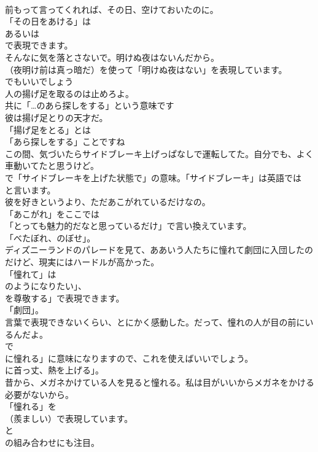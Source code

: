 \documentclass[8pt]{extreport}
\begin{document}
\begin{CJK}{UTF8}{min}
\\	前もって言ってくれれば、その日、空けておいたのに。 
\\	「その日をあける」は
\\	あるいは
\\	で表現できます。	
\\	そんなに気を落とさないで。明けぬ夜はないんだから。 
\\	（夜明け前は真っ暗だ）を使って「明けぬ夜はない」を表現しています。
\\	でもいいでしょう	
\\	人の揚げ足を取るのは止めろよ。 
\\	共に「…のあら探しをする」という意味です	
\\	彼は揚げ足とりの天才だ。 
\\	「揚げ足をとる」とは
\\	「あら探しをする」ことですね	
\\	この間、気づいたらサイドブレーキ上げっぱなしで運転してた。自分でも、よく車動いてたと思うけど。 
\\	で「サイドブレーキを上げた状態で」の意味。「サイドブレーキ」は英語では
\\	と言います。	
\\	彼を好きというより、ただあこがれているだけなの。 
\\	「あこがれ」をここでは
\\	「とっても魅力的だなと思っているだけ」で言い換えています。
\\	「べたぼれ、のぼせ」。	
\\	ディズニーランドのパレードを見て、ああいう人たちに憧れて劇団に入団したのだけど、現実にはハードルが高かった。 
\\	「憧れて」は
\\	のようになりたい」、
\\	を尊敬する」で表現できます。
\\	「劇団」。	
\\	言葉で表現できないくらい、とにかく感動した。だって、憧れの人が目の前にいるんだよ。 
\\	で
\\	に憧れる」に意味になりますので、これを使えばいいでしょう。
\\	に首っ丈、熱を上げる」。	
\\	昔から、メガネかけている人を見ると憧れる。私は目がいいからメガネをかける必要がないから。 
\\	「憧れる」を 
\\	（羨ましい）で表現しています。
\\	と 
\\	の組み合わせにも注目。	

\end{CJK}
\end{document}
